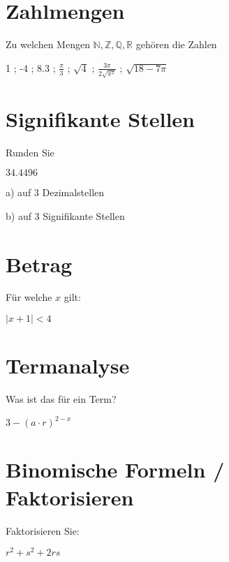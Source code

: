 


\usepackage{amssymb} %
\renewcommand{\metaHeaderLine}{Rückblick}
\renewcommand{\arbeitsblattTitel}{1. Jahr TALS}

\arbeitsblattHeader{}

\section{Zahlmengen}
Zu welchen Mengen $\mathbb{N}, \mathbb{Z}, \mathbb{Q}, \mathbb{R}$ gehören die Zahlen

1 ;
-4 ;
8.3 ;
$\frac{\pi}{3}$ ;
$\sqrt{4}$ ;
$\frac{3\pi}{2\sqrt{\pi^2}}$ ;
$\sqrt{18-7\pi}$ 

\section{Signifikante Stellen}
Runden Sie

$34.4496$

a) auf 3 Dezimalstellen 

b) auf 3 Signifikante Stellen 


\section{Betrag}
Für welche $x$ gilt:

$|x+1| < 4$


\section{Termanalyse}
Was ist das für ein Term?

$3 - (a\cdot{}r)^{2-x}$ 

\section{Binomische Formeln / Faktorisieren}
Faktorisieren Sie:

$r^2 + s^2 + 2rs$    

